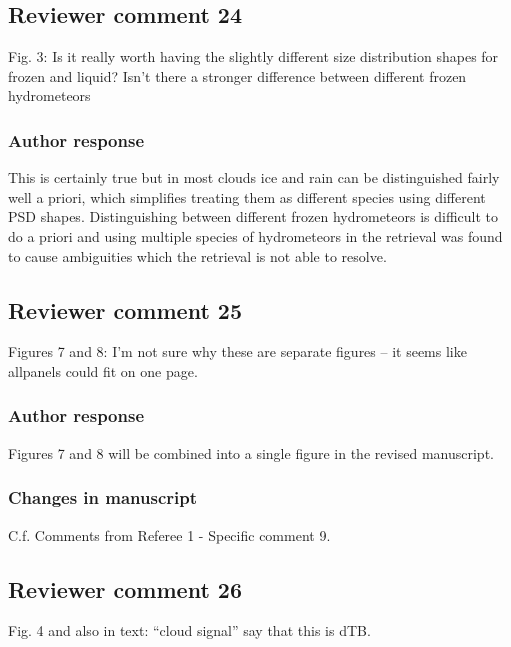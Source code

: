 \subsection*{Reviewer comment 24}

Fig.  3: Is it really worth having the slightly different size distribution shapes for frozen and liquid? Isn’t there a stronger difference between different frozen hydrometeors

\subsubsection*{Author response}

This is certainly true but in most clouds ice and rain can be distinguished
fairly well a priori, which simplifies treating them as different species using
different PSD shapes. Distinguishing between different frozen hydrometeors is
difficult to do a priori and using multiple species of hydrometeors in the
retrieval was found to cause ambiguities which the retrieval is not able to
resolve.



\subsection*{Reviewer comment 25}
Figures 7 and 8:  I’m not sure why these are separate figures – it seems like allpanels could fit on one page.

\subsubsection*{Author response}

Figures 7 and 8 will be combined into a single figure in the revised manuscript.

\subsubsection*{Changes in manuscript}

C.f. Comments from Referee 1 - Specific comment 9.

\subsection*{Reviewer comment 26}
Fig. 4 and also in text: “cloud signal” say that this is dTB.

